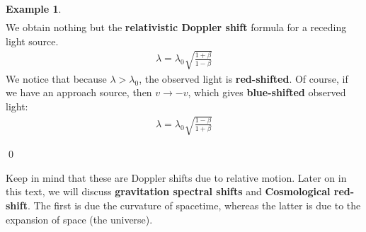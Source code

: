 \documentclass{book}
\theoremstyle{definition}
\newtheorem{exmp}{Example}[section]
\begin{document}
\begin{exmp}
\begin{align*}
	\end{align*}
	We obtain nothing but the \textbf{relativistic Doppler shift} formula for a receding light source. 
	\begin{align*}
	\boxed{\lambda = \lambda_0 \sqrt{\frac{1+\beta}{1-\beta}}}
	\end{align*}
	We notice that because $\lambda > \lambda_0$, the observed light is \textbf{red-shifted}. Of course, if we have an approach source, then $v \rightarrow -v$, which gives \textbf{blue-shifted} observed light:
	\begin{align*}
	\boxed{\lambda = \lambda_0\sqrt{\frac{1-\beta}{1+\beta}}}
	\end{align*}
\end{exmp}\qed

Keep in mind that these are Doppler shifts due to relative motion. Later on in this text, we will discuss \textbf{gravitation spectral shifts} and \textbf{Cosmological red-shift}. The first is due the curvature of spacetime, whereas the latter is due to the expansion of space (the universe).\\
\end{document}
